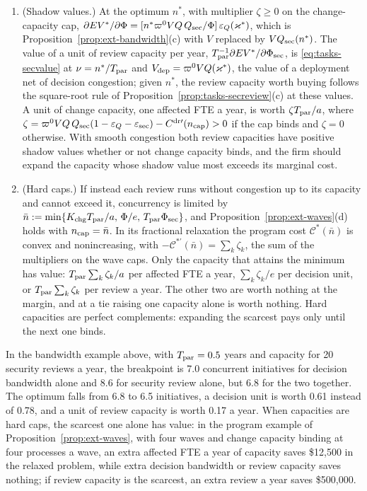 \begin{remark}
\begin{enumerate}
\item[(b)] (Shadow values.) At the optimum $n^*$, with multiplier $\zeta\ge0$ on the change-capacity cap, $\partial EV^*/\partial\Phi=[n^*\varpi^0VQ\,Q_{\rm sec}/\Phi]\,\varepsilon_Q(\varkappa^*)$, which is Proposition~\ref{prop:ext-bandwidth}(c) with $V$ replaced by $VQ_{\rm sec}(n^*)$. The value of a unit of review capacity per year, $T_{\rm par}^{-1}\partial EV^*/\partial\Phi_{\rm sec}$, is \eqref{eq:tasks-secvalue} at $\nu=n^*/T_{\rm par}$ and $V_{\rm dep}=\varpi^0VQ(\varkappa^*)$, the value of a deployment net of decision congestion; given $n^*$, the review capacity worth buying follows the square-root rule of Proposition~\ref{prop:tasks-secreview}(c) at these values. A unit of change capacity, one affected FTE a year, is worth $\zeta T_{\rm par}/a$, where $\zeta=\varpi^0VQ\,Q_{\rm sec}(1-\varepsilon_Q-\varepsilon_{\rm sec})-C^{\rm dr\prime}(n_{\rm cap})>0$ if the cap binds and $\zeta=0$ otherwise. With smooth congestion both review capacities have positive shadow values whether or not change capacity binds, and the firm should expand the capacity whose shadow value most exceeds its marginal cost.
\item[(c)] (Hard caps.) If instead each review runs without congestion up to its capacity and cannot exceed it, concurrency is limited by $\bar n:=\min\{K_{\rm chg}T_{\rm par}/a,\,\Phi/e,\,T_{\rm par}\Phi_{\rm sec}\}$, and Proposition~\ref{prop:ext-waves}(d) holds with $n_{\rm cap}=\bar n$. In its fractional relaxation the program cost $\mathcal C^*(\bar n)$ is convex and nonincreasing, with $-\mathcal C^{*\prime}(\bar n)=\sum_k\zeta_k$, the sum of the multipliers on the wave caps. Only the capacity that attains the minimum has value: $T_{\rm par}\sum_k\zeta_k/a$ per affected FTE a year, $\sum_k\zeta_k/e$ per decision unit, or $T_{\rm par}\sum_k\zeta_k$ per review a year. The other two are worth nothing at the margin, and at a tie raising one capacity alone is worth nothing. Hard capacities are perfect complements: expanding the scarcest pays only until the next one binds.
\end{enumerate}
\end{remark}

\noindent In the bandwidth example above, with $T_{\rm par}=0.5$ years and capacity for 20 security reviews a year, the breakpoint is 7.0 concurrent initiatives for decision bandwidth alone and 8.6 for security review alone, but 6.8 for the two together. The optimum falls from 6.8 to 6.5 initiatives, a decision unit is worth 0.61 instead of 0.78, and a unit of review capacity is worth 0.17 a year. When capacities are hard caps, the scarcest one alone has value: in the program example of Proposition~\ref{prop:ext-waves}, with four waves and change capacity binding at four processes a wave, an extra affected FTE a year of capacity saves \$12,500 in the relaxed problem, while extra decision bandwidth or review capacity saves nothing; if review capacity is the scarcest, an extra review a year saves \$500,000.


